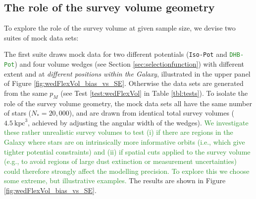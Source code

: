 \documentclass[iop,revtex4]{emulateapj}
\newcommand{\pmodel}{\ensuremath{p_M}}
\newcommand{\NEW}[1]{\textcolor{ForestGreen}{#1}}
\newcommand{\OLD}[1]{}
\begin{document}
\subsection{The role of the survey volume geometry} \label{sec:results_obsvolume}

To explore the role of the survey volume at given sample size, we devise two suites of mock data sets: 

The first suite draws mock data for two different potentials (\texttt{Iso-Pot} and \OLD{\texttt{MW13-Pot}}\NEW{\texttt{DHB-Pot}}) and four volume wedges (see Section \ref{sec:selectionfunction}) with different extent and at {\it different positions within the Galaxy}, illustrated in the upper panel of Figure \ref{fig:wedFlexVol_bias_vs_SE}. Otherwise the data sets are generated from the same \pmodel{} (see Test \ref{test:wedFlexVol} in Table \ref{tbl:tests}). To isolate the role of the survey volume geometry, the mock data sets all have the same number of stars ($N_{*} = 20,000$)\OLD{in all cases}, and are drawn from identical total survey volumes ($4.5~\text{kpc}^3$, achieved by adjusting the angular width of the wedges).
\NEW{We investigate these rather unrealistic survey volumes to test (i) if there are regions in the Galaxy where stars are on intrinsically more informative orbits (i.e., which give tighter potential constraints) and (ii) if spatial cuts applied to the survey volume (e.g., to avoid regions of large dust extinction or measurement uncertainties) could therefore strongly affect the modelling precision. To explore this we choose some extreme, but illustrative examples.}
The results are shown in Figure \ref{fig:wedFlexVol_bias_vs_SE}.
\end{document}
